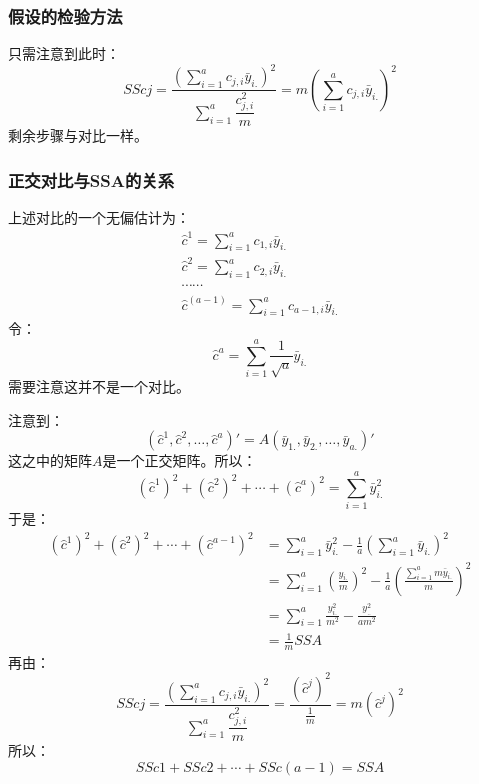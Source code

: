 \subsubsection{假设的检验方法}
只需注意到此时：
\begin{equation*}
	SScj=\frac{\left(\sum\limits_{i=1}^ac_{j,i}\bar{y}_{i.}\right)^2}{\sum\limits_{i=1}^a\dfrac{c_{j,i}^2}{m}}=m\left(\sum\limits_{i=1}^ac_{j,i}\bar{y}_{i.}\right)^2
\end{equation*}
剩余步骤与对比一样。
\subsubsection{正交对比与SSA的关系}
上述对比的一个无偏估计为：
\begin{gather*}
	\hat{c}^1=\sum_{i=1}^ac_{1,i}\bar{y}_{i.} \\
	\hat{c}^2=\sum_{i=1}^ac_{2,i}\bar{y}_{i.} \\
	\cdots\cdots \\
	\hat{c}^{(a-1)}=\sum_{i=1}^ac_{a-1,i}\bar{y}_{i.}
\end{gather*}
令：
\begin{equation*}
	\hat{c}^{a}=\sum_{i=1}^a\frac{1}{\sqrt{a}}\bar{y}_{i.}
\end{equation*}
需要注意这并不是一个对比。\par
注意到：
\begin{equation*}
	(\hat{c}^1,\hat{c}^2,\dots,\hat{c}^a)'=A(\bar{y}_{1.},\bar{y}_{2.},\dots,\bar{y}_{a.})'
\end{equation*}
这之中的矩阵$A$是一个正交矩阵。所以：
\begin{equation*}
	(\hat{c}^1)^2+(\hat{c}^2)^2+\cdots+(\hat{c}^a)^2=\sum_{i=1}^a\bar{y}_{i.}^2
\end{equation*}
于是：
\begin{align*}
	(\hat{c}^1)^2+(\hat{c}^2)^2+\cdots+(\hat{c}^{a-1})^2
	&=\sum_{i=1}^a\bar{y}_{i.}^2-\frac{1}{a}\left(\sum\limits_{i=1}^a\bar{y}_{i.}\right)^2 \\
	&=\sum_{i=1}^a\left(\frac{y_{i.}}{m}\right)^2-\frac{1}{a}\left(\frac{\sum_{i=1}^am\bar{y}_{i.}}{m}\right)^2 \\
	&=\sum_{i=1}^a\frac{y_{i.}^2}{m^2}-\frac{y_{..}^2}{am^2} \\
	&=\frac{1}{m}SSA
\end{align*}
再由：
\begin{equation*}
	SScj=\frac{\left(\sum\limits_{i=1}^ac_{j,i}\bar{y}_{i.}\right)^2}{\sum\limits_{i=1}^a\dfrac{c_{j,i}^2}{m}}=\frac{(\hat{c}^j)^2}{\frac{1}{m}}=m(\hat{c}^j)^2
\end{equation*}
所以：
\begin{equation*}
	SSc1+SSc2+\cdots+SSc(a-1)=SSA
\end{equation*}

